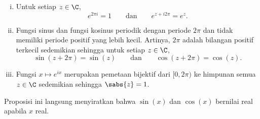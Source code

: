 \begin{prop}
\begin{enumerate}[(i)]
\item
Untuk setiap $z \in \C$,
\begin{equation*}
e^{2\pi i} = 1 \qquad \text{dan} \qquad e^{z + i 2\pi} = e^z.
\end{equation*}
\item
Fungsi sinus dan fungsi kosinus periodik dengan periode $2\pi$ dan tidak memiliki periode positif
yang lebih kecil. Artinya, $2\pi$ adalah bilangan positif terkecil sedemikian sehingga untuk setiap $z \in \C$,
\begin{equation*}
\sin(z+2\pi) = \sin(z)
\qquad \text{dan} \qquad
\cos(z+2\pi) = \cos(z) .
\end{equation*}
\item
Fungsi $x \mapsto e^{ix}$ merupakan pemetaan bijektif dari $[0,2\pi)$
ke himpunan semua $z \in \C$ sedemikian sehingga $\sabs{z} = 1$.
\end{enumerate}
\end{prop}

Proposisi ini langsung menyiratkan bahwa $\sin(x)$ dan $\cos(x)$ bernilai
real apabila $x$ real.


